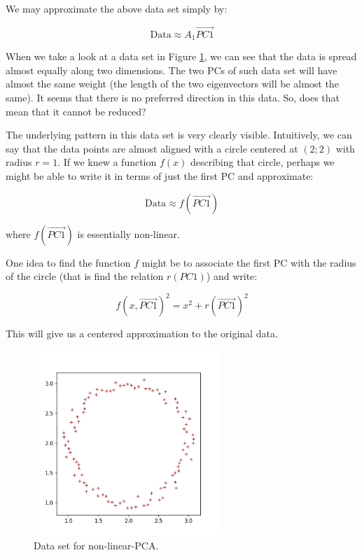 \documentclass[20pt,twocolumn]{article}
\begin{document}
We may approximate the above data set simply by:

\begin{equation}
\text{Data} \approx A_1 \vec{PC1}
\end{equation}

When we take a look at a data set in Figure \ref{fig:nonlinear_PCA_data}, we can see that the data is spread almost equally along two dimensions. The two PCs of such data set will have almost the same weight (the length of the two eigenvectors will be almost the same). It seems that there is no preferred direction in this data. So, does that mean that it cannot be reduced?

The underlying pattern in this data set is very clearly visible. Intuitively, we can say that the data points are almost aligned with a circle centered at $(2;2)$ with radius $r=1$. If we knew a function $f(x)$ describing that circle, perhaps we might be able to write it in terms of just the first PC and approximate:

\begin{equation}
\text{Data} \approx f(\vec{PC1})
\end{equation}

where $f(\vec{PC1})$ is essentially non-linear.

One idea to find the function $f$ might be to associate the first PC with the radius of the circle (that is find the relation $r(PC1)$) and write:

\begin{equation}
f(x, \vec{PC1})^2 = x^2 + r(\vec{PC1})^2
\end{equation}

This will give us a centered approximation to the original data. 

\begin{figure}[H]
\centering\includegraphics[width=7cm]{../python/PCA-fake-datasets/PCA_nonlinear_scatter_2.png}
\caption{Data set for non-linear-PCA.}			
\label{fig:nonlinear_PCA_data}
\end{figure}
\end{document}
